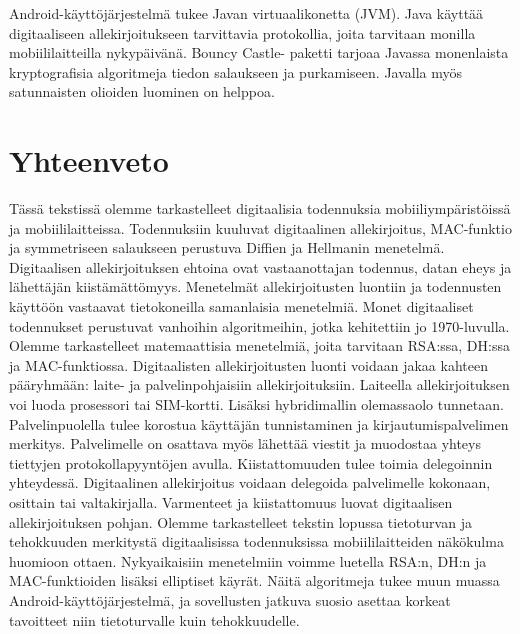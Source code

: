 \documentclass[finnish]{tktltiki2}
\theoremstyle{definition}
\theoremstyle{remark}
\begin{document}
Android-käyttöjärjestelmä tukee Javan virtuaalikonetta (JVM). Java käyttää digitaaliseen allekirjoitukseen tarvittavia protokollia, joita tarvitaan monilla mobiililaitteilla nykypäivänä. Bouncy Castle- paketti tarjoaa Javassa monenlaista kryptografisia algoritmeja tiedon salaukseen ja purkamiseen. Javalla myös satunnaisten olioiden luominen on helppoa. \cite{enti} 
   

\section{Yhteenveto}  

Tässä tekstissä olemme tarkastelleet digitaalisia todennuksia mobiiliympäristöissä ja mobiililaitteissa. Todennuksiin kuuluvat digitaalinen allekirjoitus, MAC-funktio ja symmetriseen salaukseen perustuva Diffien ja Hellmanin menetelmä. Digitaalisen allekirjoituksen ehtoina ovat vastaanottajan todennus, datan eheys ja lähettäjän kiistämättömyys. Menetelmät allekirjoitusten luontiin ja todennusten käyttöön vastaavat tietokoneilla samanlaisia menetelmiä. Monet digitaaliset todennukset perustuvat vanhoihin algoritmeihin, jotka kehitettiin jo 1970-luvulla. Olemme tarkastelleet matemaattisia menetelmiä, joita tarvitaan RSA:ssa, DH:ssa ja MAC-funktiossa. Digitaalisten allekirjoitusten luonti voidaan jakaa kahteen pääryhmään: laite- ja palvelinpohjaisiin allekirjoituksiin. Laiteella allekirjoituksen voi luoda prosessori tai SIM-kortti. Lisäksi hybridimallin olemassaolo tunnetaan. Palvelinpuolella tulee korostua käyttäjän tunnistaminen ja kirjautumispalvelimen merkitys. Palvelimelle on osattava myös lähettää viestit ja muodostaa yhteys tiettyjen protokollapyyntöjen avulla. Kiistattomuuden tulee toimia delegoinnin yhteydessä. Digitaalinen allekirjoitus voidaan delegoida palvelimelle kokonaan, osittain tai valtakirjalla. Varmenteet ja kiistattomuus luovat digitaalisen allekirjoituksen pohjan. Olemme tarkastelleet tekstin lopussa tietoturvan ja tehokkuuden merkitystä digitaalisissa todennuksissa mobiililaitteiden näkökulma huomioon ottaen. Nykyaikaisiin menetelmiin voimme luetella RSA:n, DH:n ja MAC-funktioiden lisäksi elliptiset käyrät. Näitä algoritmeja tukee muun muassa Android-käyttöjärjestelmä, ja sovellusten jatkuva suosio asettaa korkeat tavoitteet niin tietoturvalle kuin tehokkuudelle.

%
%
%

\newpage






 
\end{document}
